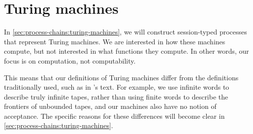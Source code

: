 \section{Turing machines}

In \cref{sec:process-chains:turing-machines}, we will construct session-typed processes that represent Turing machines.
We are interested in how these machines compute, but not interested in what functions they compute.
In other words, our focus is on computation, not computability.

This means that our definitions of Turing machines differ from the definitions traditionally used, such as in \citeauthor{Hopcroft+:06}'s text\autocite{Hopcroft+:06}.
For example, we use infinite words to describe truly infinite tapes, rather than using finite words to describe the frontiers of unbounded tapes, and our machines also have no notion of acceptance.
The specific reasons for these differences will become clear in \cref{sec:process-chains:turing-machines}.

